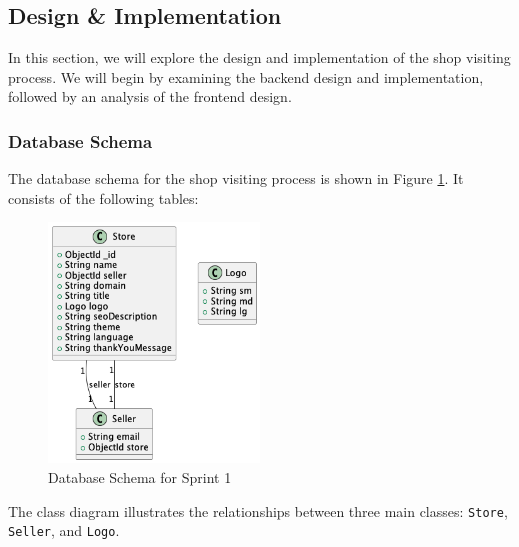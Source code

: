 \subsection{Design \& Implementation}
In this section, we will explore the design and implementation of the shop visiting process. We will begin by examining the backend design and implementation, followed by an analysis of the frontend design.

\subsubsection{Database Schema}
The database schema for the shop visiting process is shown in Figure \ref{fig:db_schema_sprint1}. It consists of the following tables:

\begin{figure}[H]
    \centering
    \includegraphics[width=0.5\textwidth]{images/sprintOneClass.png}
    \caption{Database Schema for Sprint 1}
    \label{fig:db_schema_sprint1}
\end{figure}

The class diagram illustrates the relationships between three main classes: \texttt{Store}, \texttt{Seller}, and \texttt{Logo}.

